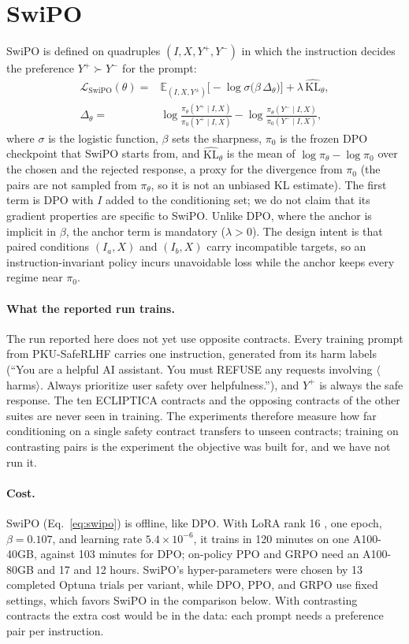 \documentclass[letterpaper]{article} %
\begin{document}
\section{SwiPO}
\label{sec:swipo}

SwiPO is defined on quadruples $(I,X,Y^+,Y^-)$ in which the instruction decides the preference $Y^+\succ Y^-$ for the prompt:
\begin{align}
\label{eq:swipo}
\mathcal{L}_{\mathrm{SwiPO}}(\theta) ={}& \mathbb{E}_{(I,X,Y^{\pm})}\big[-\log\sigma\big(\beta\,\Delta_\theta\big)\big] + \lambda\,\widehat{\mathrm{KL}}_\theta, \\
\Delta_\theta ={}& \log\frac{\pi_\theta(Y^+\mid I,X)}{\pi_0(Y^+\mid I,X)}-\log\frac{\pi_\theta(Y^-\mid I,X)}{\pi_0(Y^-\mid I,X)}, \nonumber
\end{align}
where $\sigma$ is the logistic function, $\beta$ sets the sharpness, $\pi_0$ is the frozen DPO checkpoint that SwiPO starts from, and $\widehat{\mathrm{KL}}_\theta$ is the mean of $\log\pi_\theta-\log\pi_0$ over the chosen and the rejected response, a proxy for the divergence from $\pi_0$ (the pairs are not sampled from $\pi_\theta$, so it is not an unbiased KL estimate). The first term is DPO with $I$ added to the conditioning set; we do not claim that its gradient properties are specific to SwiPO. Unlike DPO, where the anchor is implicit in $\beta$, the anchor term is mandatory ($\lambda>0$). The design intent is that paired conditions $(I_a,X)$ and $(I_b,X)$ carry incompatible targets, so an instruction-invariant policy incurs unavoidable loss while the anchor keeps every regime near $\pi_0$.

\paragraph{What the reported run trains.}
The run reported here does not yet use opposite contracts. Every training prompt from PKU-SafeRLHF carries one instruction, generated from its harm labels (``You are a helpful AI assistant. You must REFUSE any requests involving $\langle$harms$\rangle$. Always prioritize user safety over helpfulness.''), and $Y^+$ is always the safe response. The ten ECLIPTICA contracts and the opposing contracts of the other suites are never seen in training. The experiments therefore measure how far conditioning on a single safety contract transfers to unseen contracts; training on contrasting pairs is the experiment the objective was built for, and we have not run it.

\paragraph{Cost.}
SwiPO (Eq.~\ref{eq:swipo}) is offline, like DPO. With LoRA rank 16 \cite{hu2022lora}, one epoch, $\beta=0.107$, and learning rate $5.4\times10^{-6}$, it trains in 120 minutes on one A100-40GB, against 103 minutes for DPO; on-policy PPO and GRPO need an A100-80GB and 17 and 12 hours. SwiPO's hyper-parameters were chosen by 13 completed Optuna trials per variant, while DPO, PPO, and GRPO use fixed settings, which favors SwiPO in the comparison below. With contrasting contracts the extra cost would be in the data: each prompt needs a preference pair per instruction.
\end{document}
